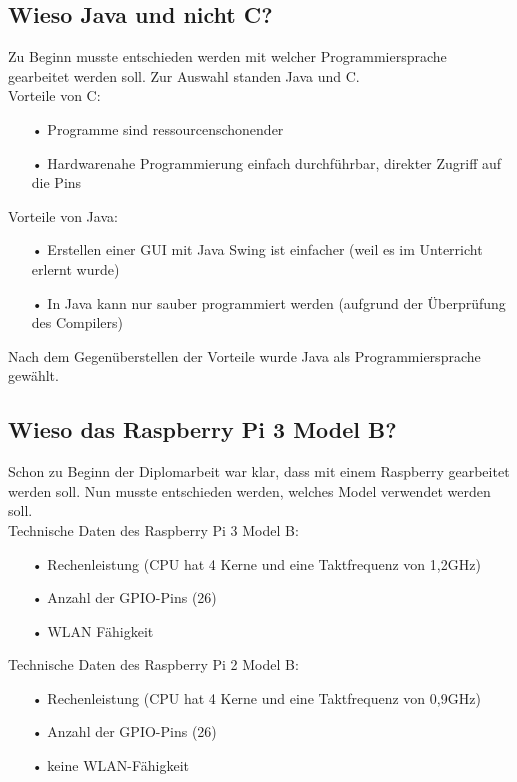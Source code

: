 \subsection{Wieso Java und nicht C?}
Zu Beginn musste entschieden werden mit welcher Programmiersprache gearbeitet werden soll. Zur Auswahl standen Java und C.
\\Vorteile von C:
\begin{itemize}
\item[•] Programme sind ressourcenschonender
\item[•] Hardwarenahe Programmierung einfach durchführbar, direkter Zugriff auf die Pins
\end{itemize}
Vorteile von Java:
\begin{itemize}
\item[•] Erstellen einer \ac{GUI} mit Java Swing ist einfacher (weil es im Unterricht erlernt wurde)
\item[•] In Java kann nur sauber programmiert werden (aufgrund der Überprüfung des Compilers)
\end{itemize}

Nach dem Gegenüberstellen der Vorteile wurde Java als Programmiersprache gewählt.

\subsection{Wieso das Raspberry Pi 3 Model B?}
Schon zu Beginn der Diplomarbeit war klar, dass mit einem Raspberry gearbeitet werden soll. Nun musste entschieden werden, welches Model verwendet werden soll.
\\ Technische Daten des Raspberry Pi 3 Model B:
\begin{itemize}
\item[•] Rechenleistung (CPU hat 4 Kerne und eine Taktfrequenz von 1,2GHz)
\item[•] Anzahl der \ac{GPIO}-Pins (26)
\item[•] \ac{WLAN} Fähigkeit
\end{itemize}

Technische Daten des Raspberry Pi 2 Model B:
\begin{itemize}
\item[•] Rechenleistung (CPU hat 4 Kerne und eine Taktfrequenz von 0,9GHz)
\item[•] Anzahl der \ac{GPIO}-Pins (26)
\item[•] keine \ac{WLAN}-Fähigkeit
\end{itemize}

